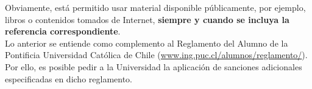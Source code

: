 \documentclass[10pt,letterpaper]{extarticle}
\begin{document}
Obviamente, está permitido usar material disponible públicamente, por ejemplo,
libros o contenidos tomados de Internet, \textbf{siempre y cuando se incluya la
referencia correspondiente}.\\

Lo anterior se entiende como complemento al Reglamento del Alumno de la
Pontificia Universidad Católica de Chile
(\href{http://www.ing.puc.cl/alumnos/reglamento/}{www.ing.puc.cl/alumnos/reglamento/}).
Por ello, es posible pedir a la Universidad la aplicación de sanciones
adicionales especificadas en dicho reglamento.
\end{document}
